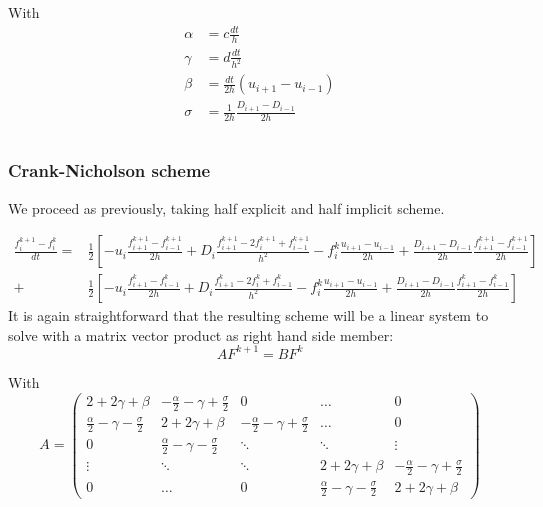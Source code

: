 \documentclass[11pt,a4paper]{article}
\begin{document}
With
\begin{align*}
\alpha &= c \frac{dt}{h} \\
\gamma &= d \frac{dt}{h^2}  \\
\beta  &= \frac{dt}{2h} \left( u_{i+1}-u_{i-1} \right)  \\
\sigma &= \frac{1}{2h}\frac{D_{i+1} - D_{i-1}}{2h}  \\ \\
\end{align*}

\subsubsection{Crank-Nicholson scheme}
We proceed as previously, taking half explicit and half implicit scheme.


\begin{align*}\label{eq:CrankNicolson}
\frac{f_i^{k+1} - f_i^{k}}{dt} =& \frac{1}{2} \left[ - u_i \frac{f_{i+1}^{k+1} - f_{i-1}^{k+1}}{2h} 
				+ D_i \frac{f_{i+1}^{k+1} - 2 f_{i}^{k+1} + f_{i-1}^{k+1}}{h^{2}} 
				- f_i^k \frac{u_{i+1} - u_{i-1} }{2h}
				+ \frac{D_{i+1} - D_{i-1} }{2h} \frac{f_{i+1}^{k+1} - f_{i-1}^{k+1}}{2h} \right] \\ 								+ &\frac{1}{2} \left[ - u_i \frac{f_{i+1}^{k} - f_{i-1}^{k}}{2h} 
				+ D_i \frac{f_{i+1}^{k} - 2 f_{i}^{k} + f_{i-1}^{k}}{h^{2}} 
				- f_i^k \frac{u_{i+1} - u_{i-1} }{2h}
				+ \frac{D_{i+1} - D_{i-1} }{2h} \frac{f_{i+1}^{k} - f_{i-1}^{k}}{2h} \right] \
\end{align*}
It is again straightforward that the resulting scheme will be a linear system to solve with a matrix vector product as right hand side member: 
\[ A F^{k+1} = B F^k\]

With \[
A = \begin{pmatrix}
      2+2\gamma + \beta &-\frac{\alpha}{2} - \gamma +\frac{\sigma}{2} & 0   & \dots     & 0   \\
      \frac{\alpha}{2} -  \gamma - \frac{\sigma}{2} & 2+2\gamma + \beta       & -\frac{\alpha}{2} - \gamma +\frac{\sigma}{2}  & \dots     & 0 \\
      0&         \frac{\alpha}{2} -  \gamma - \frac{\sigma}{2}& \ddots         & \ddots    & \vdots    \\
      \vdots&         \ddots&           \ddots &     2+2\gamma + \beta      & -\frac{\alpha}{2} - \gamma +\frac{\sigma}{2} \\
      0&         \dots&           0&          \frac{\alpha}{2} -  \gamma - \frac{\sigma}{2} & 2+2\gamma + \beta
  \end{pmatrix}
\]
\end{document}
